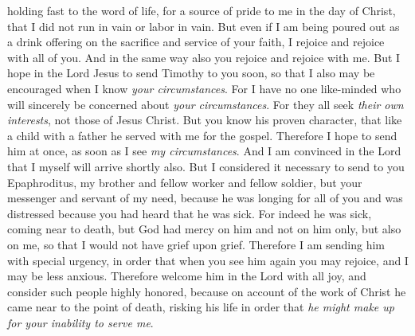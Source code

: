 \begin{biblechapter}
\verse holding fast to the word of life, for a source of pride to me in the day of Christ, that I did not run in vain or labor in vain.
\verse But even if I am being poured out as a drink offering on the sacrifice and service of your faith, I rejoice and rejoice with all of you.
\verse And in the same way also you rejoice and rejoice with me.
 But I hope in the Lord Jesus to send Timothy to you soon, so that I also may be encouraged when I know \textit{your circumstances}.
\verse For I have no one like-minded who will sincerely be concerned about \textit{your circumstances}.
\verse For they all seek \textit{their own interests}, not those of Jesus Christ.
\verse But you know his proven character, that like a child with a father he served with me for the gospel.
\verse Therefore I hope to send him at once, as soon as I see \textit{my circumstances}.
\verse And I am convinced in the Lord that I myself will arrive shortly also.
 But I considered it necessary to send to you Epaphroditus, my brother and fellow worker and fellow soldier, but your messenger and servant of my need,
\verse because he was longing for all of you and was distressed because you had heard that he was sick.
\verse For indeed he was sick, coming near to death, but God had mercy on him and not on him only, but also on me, so that I would not have grief upon grief.
\verse Therefore I am sending him with special urgency, in order that when you see him again you may rejoice, and I may be less anxious.
\verse Therefore welcome him in the Lord with all joy, and consider such people highly honored,
\verse because on account of the work of Christ he came near to the point of death, risking his life in order that \textit{he might make up for your inability to serve me}.
\end{biblechapter}

